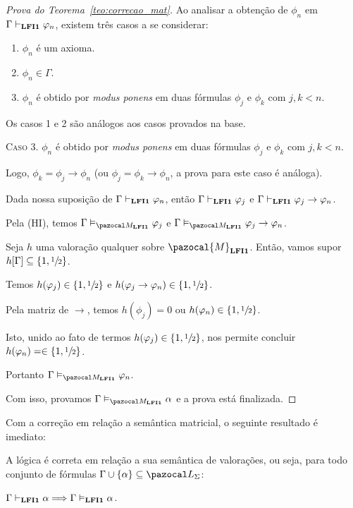 \begin{proof}[Prova do Teorema~\ref{teo:correcao_mat}]
         Ao analisar a obtenção de $\phi_{n}$ em $\Gamma \vdash_{{\normalfont\textbf{LFI1}}{}} \varphi_{n}$, existem três casos a se considerar:
         
         \begin{enumerate}
            \item $\phi_{n}$ é um axioma.
            \item $\phi_{n} \in \Gamma$.
            \item $\phi_{n}$ é obtido por \textit{modus ponens} em duas fórmulas $\phi_{j}$ e $\phi_{k}$ com $j, k < n$. 
         \end{enumerate}
         
         Os casos 1 e 2 são análogos aos casos provados na base.
         
         \noindent \textsc{Caso 3.} $\phi_{n}$ é obtido por \textit{modus ponens} em duas fórmulas $\phi_{j}$ e $\phi_{k}$ com $j, k < n$. 
         
         Logo, $\phi_{k} = \phi_{j} \to \phi_{n}$ (ou $\phi_{j} = \phi_{k} \to \phi_{n}$, a prova para este caso é análoga). 
         
         Dada nossa suposição de $\Gamma \vdash_{{\normalfont\textbf{LFI1}}{}} \varphi_{n}$, então $\Gamma \vdash_{{\normalfont\textbf{LFI1}}{}} \varphi_{j}$ e $\Gamma \vdash_{{\normalfont\textbf{LFI1}}{}} \varphi_{j} \to \varphi_{n}$. 
         
         Pela (HI), temos $\Gamma \conmat \phi_{j}$ e $\Gamma \conmat \phi_{j} \to \phi_{n}$.

         Seja $h$ uma valoração qualquer sobre $\pazocal{M}_{\lfium{}}$. Então, vamos supor $h[\Gamma] \subseteq \{1, \sfrac{1}{2}{}\}$. 
         
         Temos $h(\varphi_{j}) \in \{1, \sfrac{1}{2}{}\}$ e $h(\varphi_{j} \to \varphi_{n}) \in \{1,\sfrac{1}{2}{}\}$. 
         
         Pela matriz de $\to$, temos $h(\phi_{j}) = 0$ ou $h(\varphi_{n}) \in \{1,\sfrac{1}{2}{}\}$. 
         
         Isto, unido ao fato de termos $h(\varphi_{j}) \in \{1,\sfrac{1}{2}{}\}$, nos permite concluir $h(\varphi_{n}) = \in \{1,\sfrac{1}{2}{}\}$. 
         
         Portanto $\Gamma \conmat \phi_{n}$.

         \noindent Com isso, provamos $\Gamma \conmat \alpha$ e a prova está finalizada.

    \end{proof}

    Com a correção em relação a semântica matricial, o seguinte resultado é imediato:


    \begin{corolario}\label{cor:correcao_val}
        A lógica {\normalfont\lfium{}} é correta em relação a sua semântica de valorações, ou seja, para todo conjunto de fórmulas $\Gamma \cup \{\alpha\} \subseteq \ling{}$:

        \centering
        {\normalfont{} $\Gamma \vdash_{{\normalfont\textbf{LFI1}}{}} \alpha \Longrightarrow \Gamma \vDash_{{\normalfont\textbf{LFI1}}{}} \alpha$.}
    \end{corolario}

